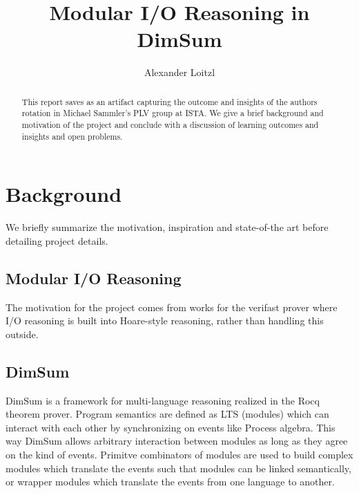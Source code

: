 \documentclass[runningheads, orivec]{llncs}
\begin{document}
\title{Modular I/O Reasoning in DimSum}
%
%
\author{Alexander Loitzl\Envelope{}}%
%

%
\maketitle              %
%
%

\begin{abstract}
  This report saves as an artifact capturing the outcome and insights of the authors rotation in Michael Sammler's PLV group at ISTA. We give a brief background and motivation of the project and conclude with a discussion of learning outcomes and insights and open problems.
\end{abstract}

\section{Background}
We briefly summarize the motivation, inspiration and state-of-the art before detailing project details.
\subsection{Modular I/O Reasoning}
The motivation for the project comes from works for the verifast prover\cite{} where I/O reasoning is built into Hoare-style reasoning, rather than handling this outside.
\subsection{DimSum}
DimSum is a framework for multi-language reasoning realized in the Rocq theorem prover. Program semantics are defined as LTS (modules) which can interact with each other by synchronizing on events like Process algebra.
This way DimSum allows arbitrary interaction between modules as long as they agree on the kind of events. Primitve combinators of modules are used to build complex modules which translate the events such that modules can be linked semantically, or wrapper modules which translate the events from one language to another.
\end{document}
